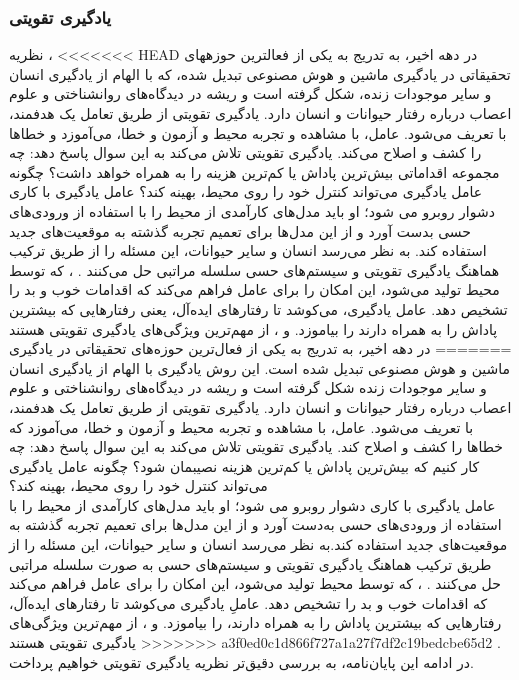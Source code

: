 \subsubsection{یادگیری تقویتی}
نظریه 
\textit{}
،
<<<<<<< HEAD
در دهه اخیر، به تدریج به یکی از فعال\nf ترین حوزه\nf های تحقیقاتی در یادگیری ماشین و هوش مصنوعی تبدیل شده، که با الهام از یادگیری انسان و سایر موجودات زنده، شکل گرفته است و ریشه در دیدگاه‌های روانشناختی و علوم اعصاب درباره رفتار حیوانات و انسان دارد.   یادگیری تقویتی از طریق تعامل یک 
\textit{}
هدفمند،
با 
\textit{}
تعریف می‌شود. عامل، با مشاهده و تجربه محیط و آزمون و خطا، می‌‌آموزد و خطاها را کشف و اصلاح می‌کند. یادگیری تقویتی تلاش می‌کند به این سوال پاسخ دهد: چه مجموعه اقداماتی بیش‌ترین پاداش یا کم‌ترین هزینه را به همراه خواهد داشت؟ چگونه عامل یادگیری می‌تواند کنترل خود را روی محیط، بهینه کند؟ عامل یادگیری با کاری دشوار روبرو می شود؛ او باید مدل‌های کارآمدی از محیط را با استفاده از ورودی‌های حسی بدست آورد و از این مدل‌ها برای تعمیم تجربه گذشته به موقعیت‌های جدید استفاده کند. به نظر می‌رسد انسان و سایر حیوانات، این مسئله را از طریق ترکیب هماهنگ یادگیری تقویتی و سیستم‌های حسی سلسله مراتبی حل می‌کنند
\cite{suttonbook}.
 \textit{}،
که توسط محیط تولید می‌شود، این امکان را برای عامل فراهم می‌کند که اقدامات خوب و بد را تشخیص دهد.  عامل یادگیری، می‌کوشد تا رفتارهای ایده‌آل، یعنی رفتارهایی که بیشترین پاداش را به همراه دارند را  بیاموزد.  و ، از مهم‌ترین ویژگی‌های یادگیری تقویتی هستند
=======
در دهه اخیر، به تدریج به یکی از فعال‌ترین حوزه‌های تحقیقاتی در یادگیری ماشین و هوش مصنوعی تبدیل شده است. این روش یادگیری با الهام از یادگیری انسان و سایر موجودات زنده شکل گرفته است و ریشه در دیدگاه‌های روانشناختی و علوم اعصاب درباره رفتار حیوانات و انسان دارد. یادگیری تقویتی از طریق تعامل یک 
\textit{
}
هدفمند،
با 
\textit{}
تعریف می‌شود. عامل، با مشاهده و تجربه محیط و آزمون و خطا، می‌‌آموزد که خطاها را کشف و اصلاح کند. یادگیری تقویتی تلاش می‌کند به این سوال پاسخ دهد: چه کار کنیم که بیش‌ترین پاداش یا کم‌ترین هزینه نصیبمان شود؟ چگونه عامل یادگیری می‌تواند کنترل خود را روی محیط، بهینه کند؟ 
\\عامل یادگیری با کاری دشوار روبرو می شود؛ او باید مدل‌های کارآمدی از محیط را با استفاده از ورودی‌های حسی به‌دست آورد و از این مدل‌ها برای تعمیم تجربه گذشته به موقعیت‌های جدید استفاده کند.به نظر می‌رسد انسان و سایر حیوانات، این مسئله را از طریق ترکیب هماهنگ یادگیری تقویتی و سیستم‌های حسی به صورت سلسله مراتبی حل می‌کنند
\cite{suttonbook}.
 \textit{}
،
که توسط محیط تولید می‌شود، این امکان را برای عامل فراهم می‌کند که اقدامات خوب و بد را تشخیص دهد. عاملِ یادگیری می‌کوشد تا رفتارهای ایده‌آل، رفتارهایی که بیشترین پاداش را به همراه دارند، را  بیاموزد.  و ، از مهم‌ترین ویژگی‌های یادگیری تقویتی هستند
>>>>>>> a3f0ed0c1d866f727a1a27f7df2c19bedcbe65d2
\cite{mldef}.
در ادامه این پایان‌نامه، به بررسی دقیق‌تر نظریه یادگیری تقویتی خواهیم پرداخت. 
 
